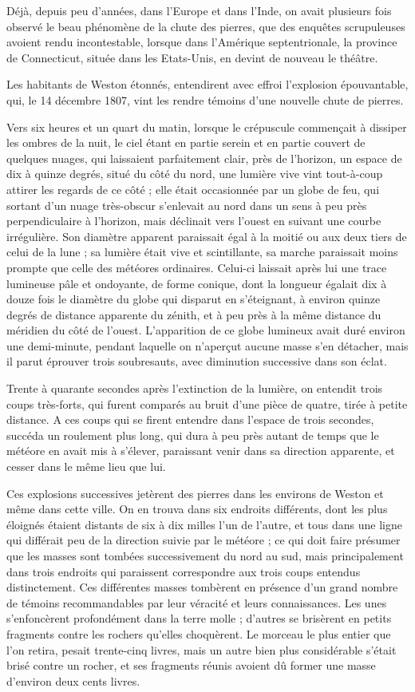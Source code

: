 \documentclass[a4paper, 12pt, oneside, french]{article}
\begin{document}
Déjà, depuis peu d'années, dans l'Europe et dans l'Inde, on avait plusieurs fois observé le beau phénomène de la chute des pierres, que des enquêtes scrupuleuses avoient rendu incontestable, lorsque dans l'Amérique septentrionale, la province de Connecticut, située dans les Etats-Unis, en devint de nouveau le théâtre.

Les habitants de Weston étonnés, entendirent avec effroi l'explosion épouvantable, qui, le 14 décembre 1807, vint les rendre témoins d'une nouvelle chute de pierres.

Vers six heures et un quart du matin, lorsque le crépuscule commençait à dissiper les ombres de la nuit, le ciel étant en partie serein et en partie couvert de quelques nuages, qui laissaient parfaitement clair, près de l'horizon, un espace de dix à quinze degrés, situé du côté du nord, une lumière vive vint tout-à-coup attirer les regards de ce côté ; elle était occasionnée par un globe de feu, qui sortant d'un nuage très-obscur s'enlevait au nord dans un sens à peu près perpendiculaire à l'horizon, mais déclinait vers l'ouest en suivant une courbe irrégulière. Son diamètre apparent paraissait égal à la moitié ou aux deux tiers de celui de la lune ; sa lumière était vive et scintillante, sa marche paraissait moins prompte que celle des météores ordinaires. Celui-ci laissait après lui une trace lumineuse pâle et ondoyante, de forme conique, dont la longueur égalait dix à douze fois le diamètre du globe qui disparut en s'éteignant, à environ quinze degrés de distance apparente du zénith, et à peu près à la même distance du méridien du côté de l'ouest. L'apparition de ce globe lumineux avait duré environ une demi-minute, pendant laquelle on n'aperçut aucune masse s'en détacher, mais il parut éprouver trois soubresauts, avec diminution successive dans son éclat.

Trente à quarante secondes après l'extinction de la lumière, on entendit trois coups très-forts, qui furent comparés au bruit d'une pièce de quatre, tirée à petite distance. A ces coups qui se firent entendre dans l'espace de trois secondes, succéda un roulement plus long, qui dura à peu près autant de temps que le météore en avait mis à s'élever, paraissant venir dans sa direction apparente, et cesser dans le même lieu que lui.

Ces explosions successives jetèrent des pierres dans les environs de Weston et même dans cette ville. On en trouva dans six endroits différents, dont les plus éloignés étaient distants de six à dix milles l'un de l'autre, et tous dans une ligne qui différait peu de la direction suivie par le météore ; ce qui doit faire présumer que les masses sont tombées successivement du nord au sud, mais principalement dans trois endroits qui paraissent correspondre aux trois coups entendus distinctement. Ces différentes masses tombèrent en présence d'un grand nombre de témoins recommandables par leur véracité et leurs connaissances. Les unes s'enfoncèrent profondément dans la terre molle ; d'autres se brisèrent en petits fragments contre les rochers qu'elles choquèrent. Le morceau le plus entier que l'on retira, pesait trente-cinq livres, mais un autre bien plus considérable s'était brisé contre un rocher, et ses fragments réunis avoient dû former une masse d'environ deux cents livres.
\end{document}
